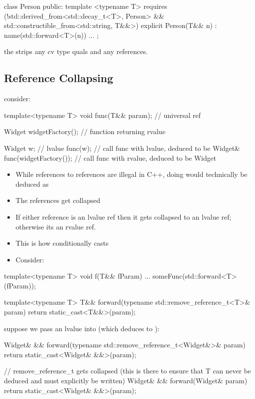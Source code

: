 \begin{cppcode}
\begin{cppcode}
class Person {
public:
  template <typename T>
    requires (!std::derived_from<std::decay_t<T>, Person> && 
              std::constructible_from<std::string, T&&>)
    explicit Person(T&& n) : name(std::forward<T>(n)) {}
    ...
};
\end{cppcode}
the  strips any cv type quals and any references.
\subsection{Reference Collapsing}
consider:
\begin{cppcode}
template<typename T>
void func(T&& param); // universal ref

Widget widgetFactory(); // function returning rvalue

Widget w; // lvalue
func(w); // call func with lvalue, deduced to be Widget&
func(widgetFactory()); // call func with rvalue, deduced to be Widget
\end{cppcode}
\begin{itemize}
  \item While references to references are illegal in C++, doing  would technically be deduced as 
  \item The references get collapsed
  \item If either reference is an lvalue ref then it gets collapsed to an lvalue ref; otherwise its an rvalue ref.
  \item This is how  conditionally casts
  \item Consider:
\end{itemize}
\begin{cppcode}
  
template<typename T>
void f(T&& fParam) {
  ...
  someFunc(std::forward<T>(fParam));
}

template<typename T>
T&& forward(typename std::remove_reference_t<T>& param) {
  return static_cast<T&&>(param);
}
\end{cppcode}
suppose we pass an lvalue  into  (which deduces to ):
\begin{cppcode}
Widget& && forward(typename std::remove_reference_t<Widget&>& param) {
  return static_cast<Widget& &&>(param);
}

// remove_reference_t gets collapsed (this is there to ensure that T can never be deduced and must explicitly be written)
Widget& && forward(Widget& param) {
  return static_cast<Widget& &&>(param);
}


\end{cppcode}
\end{cppcode}
